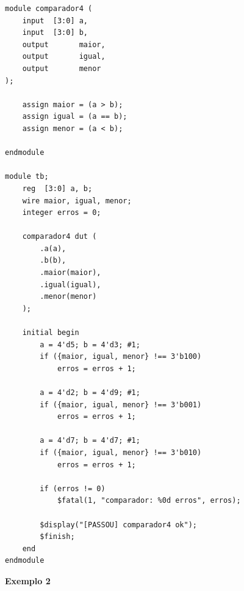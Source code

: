 \begingroup
\footnotesize
\begin{verbatim}
module comparador4 (
    input  [3:0] a,
    input  [3:0] b,
    output       maior,
    output       igual,
    output       menor
);

    assign maior = (a > b);
    assign igual = (a == b);
    assign menor = (a < b);

endmodule

module tb;
    reg  [3:0] a, b;
    wire maior, igual, menor;
    integer erros = 0;

    comparador4 dut (
        .a(a),
        .b(b),
        .maior(maior),
        .igual(igual),
        .menor(menor)
    );

    initial begin
        a = 4'd5; b = 4'd3; #1;
        if ({maior, igual, menor} !== 3'b100)
            erros = erros + 1;

        a = 4'd2; b = 4'd9; #1;
        if ({maior, igual, menor} !== 3'b001)
            erros = erros + 1;

        a = 4'd7; b = 4'd7; #1;
        if ({maior, igual, menor} !== 3'b010)
            erros = erros + 1;

        if (erros != 0)
            $fatal(1, "comparador: %0d erros", erros);

        $display("[PASSOU] comparador4 ok");
        $finish;
    end
endmodule
\end{verbatim}
\endgroup


\noindent\textbf{Exemplo 2}

